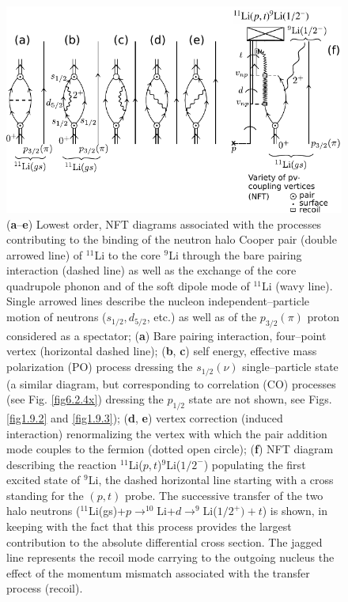           \begin{figure}
          \centerline {
          \includegraphics*[width=12cm]{introduccion/figs/figintro5xx}
          }
          \caption{(\textbf{a}--\textbf{e}) Lowest order, NFT diagrams associated with the processes contributing  to the binding of the neutron halo Cooper pair (double arrowed line) of $^{11}$Li to the core $^9$Li through the bare pairing interaction (dashed line) as well as the  exchange of the core quadrupole phonon and of the soft dipole mode of $^{11}$Li (wavy line). Single arrowed lines describe the nucleon independent--particle motion of neutrons ($s_{1/2},d_{5/2}$, etc.) as well as of the $p_{3/2}(\pi)$ proton considered as a spectator;  (\textbf{a}) Bare pairing interaction, four--point vertex (horizontal dashed line); (\textbf{b}, \textbf{c}) self energy, effective mass polarization (PO) process dressing the $s_{1/2}(\nu)$ single--particle state (a similar diagram, but corresponding to correlation (CO) processes (see Fig. \ref{fig6.2.4x}) dressing the $p_{1/2}$ state are not shown, see Figs. \ref{fig1.9.2} and \ref{fig1.9.3}); (\textbf{d}, \textbf{e}) vertex correction (induced interaction) renormalizing the  vertex with which the pair addition mode couples to the fermion (dotted open circle); (\textbf{f}) NFT diagram describing the reaction $^{11}$Li($p,t$)$^9$Li($1/2^-$) populating the first excited state of $^9$Li, the dashed horizontal line starting with a cross standing for the $(p,t)$ probe. The successive transfer of the two halo neutrons ($^{11}$Li(gs)+$p\rightarrow^{10}$Li+$d\rightarrow^9$Li($1/2^+)+t$) is shown, in keeping with the fact that this process provides the largest contribution to the absolute differential cross section. The jagged line represents the recoil mode carrying  to the outgoing nucleus the effect of the momentum mismatch associated with the transfer process (recoil).}
          \label{figintro5}
          \end{figure}

